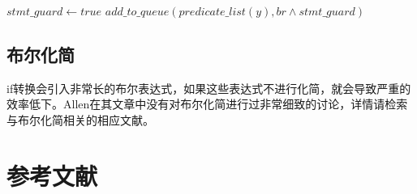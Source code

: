 \documentclass[11pt,a4paper]{article}
\begin{document}
\begin{algorithm}[H]
	\label{algo:ProcessBranch}
	\caption{$process\_branch\left(x,y,br\right)$}
	$stmt\_guard\leftarrow true$\;
	$add\_to\_queue\left(predicate\_list\left(y\right),br\wedge stmt\_guard\right)$\;
\end{algorithm}

\subsection{布尔化简}

if转换会引入非常长的布尔表达式，如果这些表达式不进行化简，就会导致严重的效率低下。Allen在其文章中没有对布尔化简进行过非常细致的讨论，详情请检索与布尔化简相关的相应文献。

\newpage

\section{参考文献}
{}

\end{document}
